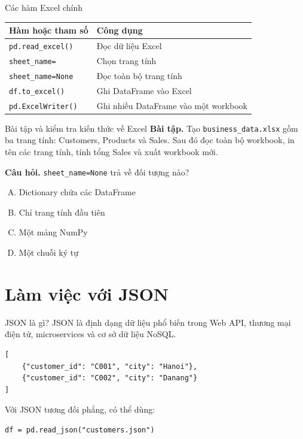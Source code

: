 \documentclass[aspectratio=169,11pt]{beamer}
\newcommand{\code}[1]{\texttt{#1}}
\newcommand{\smallgap}{\vspace{0.4em}}
\begin{document}
\begin{frame}{Các hàm Excel chính}
\begin{tabularx}{\textwidth}{lX}
\toprule
\textbf{Hàm hoặc tham số} & \textbf{Công dụng} \\
\midrule
\code{pd.read\_excel()} & Đọc dữ liệu Excel \\
\code{sheet\_name=} & Chọn trang tính \\
\code{sheet\_name=None} & Đọc toàn bộ trang tính \\
\code{df.to\_excel()} & Ghi DataFrame vào Excel \\
\code{pd.ExcelWriter()} & Ghi nhiều DataFrame vào một workbook \\
\bottomrule
\end{tabularx}
\end{frame}

\begin{frame}{Bài tập và kiểm tra kiến thức về Excel}
\textbf{Bài tập.} Tạo \code{business\_data.xlsx} gồm ba trang tính: Customers, Products và Sales. Sau đó đọc toàn bộ workbook, in tên các trang tính, tính tổng Sales và xuất workbook mới.

\smallgap
\textbf{Câu hỏi.} \code{sheet\_name=None} trả về đối tượng nào?
\begin{enumerate}[A.]
  \item Dictionary chứa các DataFrame
  \item Chỉ trang tính đầu tiên
  \item Một mảng NumPy
  \item Một chuỗi ký tự
\end{enumerate}
\end{frame}

\section{Làm việc với JSON}

\begin{frame}[fragile]{JSON là gì?}
JSON là định dạng dữ liệu phổ biến trong Web API, thương mại điện tử, microservices và cơ sở dữ liệu NoSQL.

\begin{lstlisting}[style=pythonstyle]
[
    {"customer_id": "C001", "city": "Hanoi"},
    {"customer_id": "C002", "city": "Danang"}
]
\end{lstlisting}

Với JSON tương đối phẳng, có thể dùng:
\begin{lstlisting}[style=pythonstyle]
df = pd.read_json("customers.json")
\end{lstlisting}
\end{frame}
\end{document}
